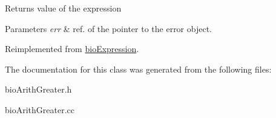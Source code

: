 \begin{DoxyReturn}{Returns}
value of the expression 
\end{DoxyReturn}

\begin{DoxyParams}{Parameters}
{\em err} & ref. of the pointer to the error object. \\
\hline
\end{DoxyParams}


Reimplemented from \hyperlink{classbio_expression_af58662a5d4d456f15bc4f2c9bd4f8a5b}{bio\+Expression}.



The documentation for this class was generated from the following files\+:\begin{DoxyCompactItemize}
\item 
bio\+Arith\+Greater.\+h\item 
bio\+Arith\+Greater.\+cc\end{DoxyCompactItemize}
